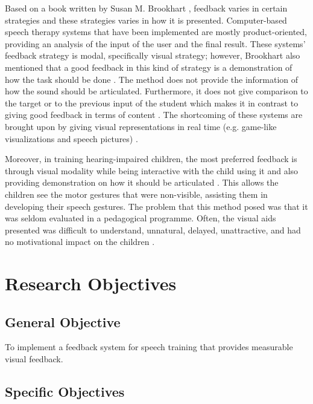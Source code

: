 Based on a book written by Susan M. Brookhart \citeyear{brookhart:2008:gef}, feedback varies in certain strategies and these strategies varies in how it is presented. Computer-based speech therapy systems that have been implemented are mostly product-oriented, providing an analysis of the input of the user and the final result. These systems' feedback strategy is modal, specifically visual strategy; however, Brookhart also mentioned that a good feedback in this kind of strategy is a demonstration of how the task should be done \cite{brookhart:2008:gef}. The method does not provide the information of how the sound should be articulated. Furthermore, it does not give comparison to the target or to the previous input of the student which makes it in contrast to giving good feedback in terms of content \cite{brookhart:2008:gef}. The shortcoming of these systems are brought upon by giving visual representations in real time (e.g. game-like visualizations and speech pictures) \cite{oster:2006:cbs}.

Moreover, in training hearing-impaired children, the most preferred feedback is through visual modality while being interactive with the child using it and also providing demonstration on how it should be articulated \cite{brookhart:2008:gef}. This allows the children see the motor gestures that were non-visible, assisting them in developing their speech gestures. The problem that this method posed was that it was seldom evaluated in a pedagogical programme. Often, the visual aids presented was difficult to understand, unnatural, delayed, unattractive, and had no motivational impact on the children \cite{oster:2006:cbs}.

\section{Research Objectives}
\label{sec:researchobjectives}

\subsection{General Objective}
\label{sec:generalobjective}
To implement a feedback system for speech training that provides measurable visual feedback.

\subsection{Specific Objectives}
\label{sec:specificobjectives}

